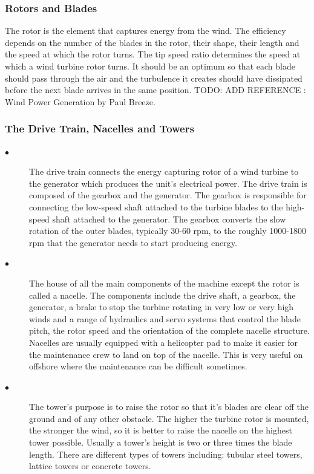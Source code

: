 \documentclass[twosided,a4,10pt]{article}
\begin{document}
\begin{multicols}{2}
 \subsubsection{Rotors and Blades}
 The rotor is the element that captures energy from the wind. The efficiency depends on the number of the blades in the rotor, their shape, their length and the speed at which the rotor turns. The tip speed ratio determines the speed at which a wind turbine rotor turns. It should be an optimum so that each blade should pass through the air and the turbulence it creates should have dissipated before the next blade arrives in the same position.
 TODO: ADD REFERENCE : Wind Power Generation by Paul Breeze.
\subsubsection{The Drive Train, Nacelles and Towers}
\begin{description}
\item[$\bullet$] 
The drive train connects the energy capturing rotor of a wind turbine to the generator which produces the unit's electrical power. The drive train is composed of the gearbox and the generator. The gearbox is responsible for connecting the low-speed shaft attached to the turbine blades to the high-speed shaft attached to the generator. The gearbox converts the slow rotation of the outer blades, typically 30-60 rpm, to the roughly 1000-1800 rpm that the generator needs to start producing energy.
\item[$\bullet$] 
The house of all the main components of the machine except the rotor is called a nacelle. The components include the drive shaft, a gearbox, the generator, a brake to stop the turbine rotating in very low or very high winds and a range of hydraulics and servo systems that control the blade pitch, the rotor speed and the orientation of the complete nacelle structure. Nacelles are usually equipped with a helicopter pad to make it easier for the maintenance crew to land on top of the nacelle. This is very useful on offshore where the maintenance can be difficult sometimes. 
\item[$\bullet$] 
The tower's purpose is to raise the rotor so that it's blades are clear off the ground and of any other obstacle. The higher the turbine rotor is mounted, the stronger the wind, so it is better to raise the nacelle on the highest tower possible. Usually a tower's height is two or three times the blade length. There are different types of towers including: tubular steel towers, lattice towers or concrete towers.


\end{description}
\end{multicols}
\end{document}
